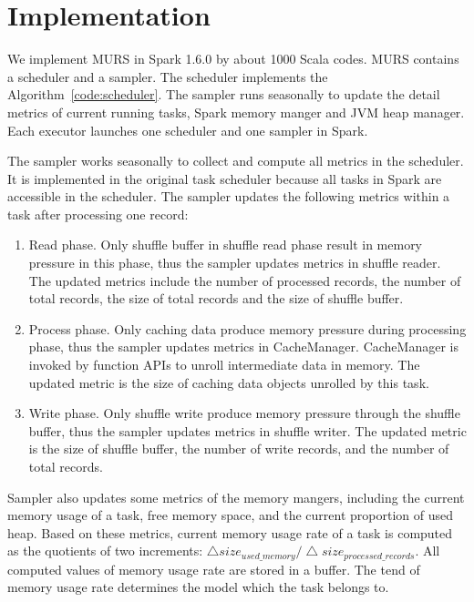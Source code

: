 \section{Implementation}

We implement MURS in Spark 1.6.0 by about 1000 Scala codes. MURS contains a scheduler and a sampler. The scheduler implements the Algorithm~\ref{code:scheduler}. The sampler runs seasonally to update the detail metrics of current running tasks, Spark memory manger and JVM heap manager. Each executor launches one scheduler and one sampler in Spark.

The sampler works seasonally to collect and compute all metrics in the scheduler. It is implemented in the original task scheduler because all tasks in Spark are accessible in the scheduler. The sampler updates the following metrics within a task after processing one record:

\begin{enumerate}

\item Read phase. Only shuffle buffer in shuffle read phase result in memory pressure in this phase, thus the sampler updates metrics in shuffle reader. The updated metrics include the number of processed records, the number of total records, the size of total records and the size of shuffle buffer.

\item Process phase. Only caching data produce memory pressure during processing phase, thus the sampler updates metrics in {\ttfamily \small CacheManager}. {\ttfamily \small CacheManager} is invoked by function APIs to unroll intermediate data in memory. The updated metric is the size of caching data objects unrolled by this task.

\item Write phase. Only shuffle write produce memory pressure through the shuffle buffer, thus the sampler updates metrics in shuffle writer. The updated metric is the size of shuffle buffer, the number of write records, and the number of total records. 

\end{enumerate}

Sampler also updates some metrics of the memory mangers, including the current memory usage of a task, free memory space, and the current proportion of used heap. Based on these metrics, current memory usage rate of a task is computed as the quotients of two increments: $\bigtriangleup size_{used\_memory} / \bigtriangleup size_{processed\_records}$. All computed values of memory usage rate are stored in a buffer. The tend of memory usage rate determines the model which the task belongs to. 

